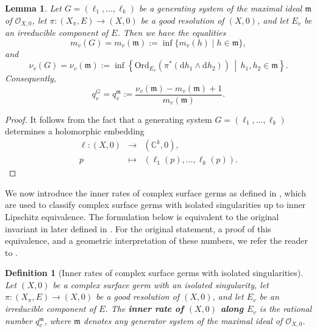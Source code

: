 \documentclass[reqno,dvipsnames,12pt]{amsart}
\newtheorem{lemm}[thm]{Lemma}
\newtheorem{defi}[thm]{Definition}
\begin{document}
\begin{lemm}\label{l'idealmaximalestsafe}
Let $G=(\ell_1,\ldots,\ell_k)$ be a generating system of the maximal ideal $\mathfrak{m}$ of $\mathcal{O}_{X,0}$, let $\pi:(X_{\pi},E)\longrightarrow (X,0)$
be a good resolution of $(X,0)$, and let $E_v$ be an irreducible component of $E$. Then we have the equalities
\[
m_v(G)=m_v(\mathfrak{m}):=\inf\{m_v(h)\mid h\in \mathfrak{m}\},
\]
and
\[
\nu_v(G)=\nu_v(\mathfrak{m}):=\inf \left\{\mathrm{Ord}_{E_v}\!\left(\pi^{*}(\mathrm{d}h_1 \wedge \mathrm{d}h_2)\right)\,\middle|\, h_1,h_2\in \mathfrak{m} \right\}.
\]
Consequently,
\[
q_v^{G}=q_v^{\mathfrak{m}}
:=\frac{\nu_v(\mathfrak{m})-m_v(\mathfrak{m})+1}{m_v(\mathfrak{m})}.
\]
\end{lemm}
\begin{proof}
   It follows from the fact that a generating system 
$G=(\ell_1,\ldots,\ell_k)$
determines a holomorphic embedding
\[
\begin{array}{rcl}
\ell:(X,0) &\longrightarrow& (\mathbb{C}^k,0), \\
p &\longmapsto& (\ell_1(p),\dots,\ell_k(p)).
\end{array}
\]
\end{proof}















We now introduce the inner rates of complex surface germs as defined in \cite{BNP}, which are used to classify complex surface germs with isolated singularities up to inner Lipschitz equivalence. The formulation below is equivalent to the original invariant  in \cite{BNP} later defined in \cite{BFP}. For the original statement, a proof of this equivalence, and a geometric interpretation of these numbers, we refer the reader to \cite[Remark 2.19]{yenni2}.

\begin{defi}[Inner rates of complex surface germs with isolated singularities]\label{genericBFP}
Let $(X,0)$ be a complex surface germ with an isolated singularity, let
$\pi:(X_{\pi},E)\longrightarrow (X,0)$ be a good resolution of $(X,0)$, and let $E_v$ be an irreducible component of $E$. The \textbf{inner rate of $(X,0)$ along $E_v$} is the rational number $q_{v}^{\mathfrak{m}}$, where $\mathfrak{m}$ denotes any generator system of the maximal ideal of $\mathcal{O}_{X,0}$. 
\end{defi}
\end{document}
